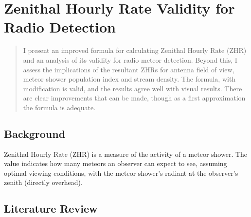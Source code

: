\chapter{Zenithal Hourly Rate Validity for Radio Detection}
\label{chap:zhr}
\begin{strip}
	\begin{minipage}{\textwidth}
		\begin{abstract}
			I present an improved formula for calculating Zenithal Hourly Rate (ZHR) and an analysis of its validity for radio meteor detection. Beyond this, I assess the implications of the resultant ZHRs for antenna field of view, meteor shower population index and stream density. The formula, with modification is valid, and the results agree well with visual results. There are clear improvements that can be made, though as a first approximation the formula is adequate.
		\end{abstract}
	\end{minipage}
\end{strip}
\section{Background}
Zenithal Hourly Rate (ZHR) is a measure of the activity of a meteor shower. The value indicates how many meteors an observer can expect to see, assuming optimal viewing conditions, with the meteor shower's radiant at the observer's zenith (directly overhead).
\section{Literature Review}
